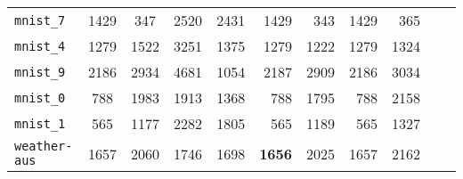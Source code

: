 \begin{tabular}{lccrrrrrrrr}
\texttt{mnist\_7} & 1429 & 347 & 2520 & 2431 & 1429 & 343 & 1429 & 365\\
\texttt{mnist\_4} & 1279 & 1522 & 3251 & 1375 & 1279 & 1222 & 1279 & 1324\\
\texttt{mnist\_9} & 2186 & 2934 & 4681 & 1054 & 2187 & 2909 & 2186 & 3034\\
\texttt{mnist\_0} & 788 & 1983 & 1913 & 1368 & 788 & 1795 & 788 & 2158\\
\texttt{mnist\_1} & 565 & 1177 & 2282 & 1805 & 565 & 1189 & 565 & 1327\\
\texttt{weather-aus} & 1657 & 2060 & 1746 & 1698 & \textbf{1656} & 2025 & 1657 & 2162\\
\bottomrule
\end{tabular}
